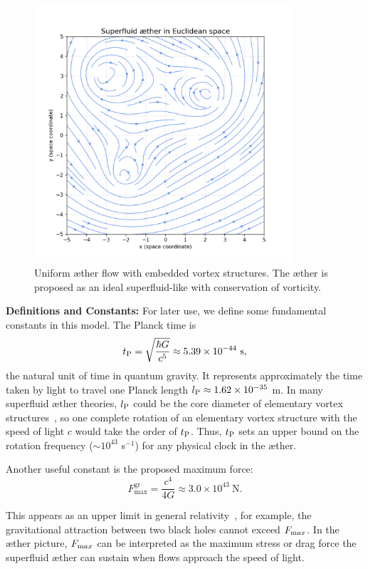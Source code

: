 \begin{figure}[htbp]
    \centering
    \includegraphics[width=0.85\textwidth]{04-ÆtherSuperfluïde}
    \caption{Uniform æther flow with embedded vortex structures. The æther is proposed as an ideal superfluid-like with conservation of vorticity.}
    \label{fig:ÆtherSuperfluïde}
\end{figure}


\textbf{Definitions and Constants:} For later use, we define some fundamental constants in this model. The Planck time is
\[
    t_{\textrm P} = \sqrt{\frac{\hbar G}{c^5}} \approx 5.39\times10^{-44}\ \text{s},
\]
the natural unit of time in quantum gravity. It represents approximately the time taken by light to travel one Planck length $l_{\textrm P} \approx 1.62\times10^{-35}$ m. In many superfluid æther theories, $l_{\textrm P}$ could be the core diameter of elementary vortex structures~\cite{Winterberg2002-PlanckÆther}, so one complete rotation of an elementary vortex structure with the speed of light $c$ would take the order of $t_{\textrm P}$. Thus, $t_{\textrm P}$ sets an upper bound on the rotation frequency ($\sim 10^{43}$ s$^{-1}$) for any physical clock in the æther.

Another useful constant is the proposed maximum force:
\begin{equation*}
    F^{\text{gr}}_{\text{max}} = \frac{c^4}{4G} \approx 3.0\times10^{43}\ \text{N}.
\end{equation*}

This appears as an upper limit in general relativity~\cite{Schiller2022-maxforce}, for example, the gravitational attraction between two black holes cannot exceed $F_{\textrm max}$. In the æther picture, $F_{\textrm max}$ can be interpreted as the maximum stress or drag force the superfluid æther can sustain when flows approach the speed of light.

